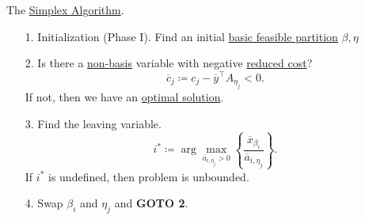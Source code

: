 \begin{prev}
	The \hyperref[algo:simplex-algorithm]{Simplex Algorithm}.
	\begin{enumerate}
		\item[1.] Initialization (Phase I). Find an initial \hyperref[def:basic-partition]{basic feasible partition} \(\beta, \eta\)
		\item[2.] Is there a \hyperref[def:non-basis]{non-basis} variable with negative \hyperref[def:reduced-cost]{reduced cost}?
		      \[
			      \overline{c}_j \coloneqq c_{j} - \overline{y}^{\top}A_{\eta_{j}}<0.
		      \]
		      If not, then we have an \hyperref[def:optimal-solution]{optimal solution}.
		\item[3.] Find the leaving variable.
		      \[
			      i^{\ast} \coloneqq \arg\max_{\overline{a}_{i, \eta_{j}}>0} {\left\{\frac{\overline{x}_{\beta_{i}}}{\overline{a}_{i, \eta_{j}}}\right\}}.
		      \]
		      If \(i^{\ast}\) is undefined, then problem is unbounded.
		\item[4.] Swap \(\beta_{i}\) and \(\eta_{j}\) and \textbf{GOTO 2}.
	\end{enumerate}
\end{prev}

